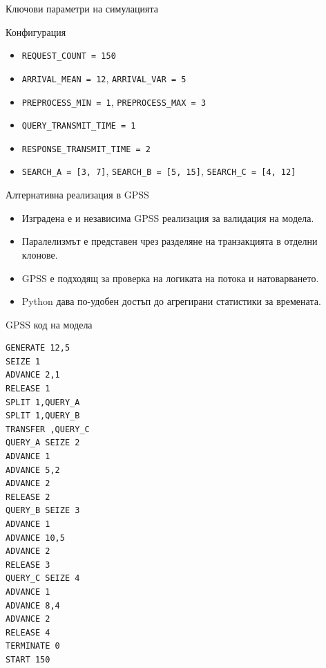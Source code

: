 \documentclass[aspectratio=169]{beamer}
\begin{document}
\begin{frame}{Ключови параметри на симулацията}
    \begin{block}{Конфигурация}
        \begin{itemize}
            \item \texttt{REQUEST\_COUNT = 150}
            \item \texttt{ARRIVAL\_MEAN = 12}, \texttt{ARRIVAL\_VAR = 5}
            \item \texttt{PREPROCESS\_MIN = 1}, \texttt{PREPROCESS\_MAX = 3}
            \item \texttt{QUERY\_TRANSMIT\_TIME = 1}
            \item \texttt{RESPONSE\_TRANSMIT\_TIME = 2}
            \item \texttt{SEARCH\_A = [3, 7]}, \texttt{SEARCH\_B = [5, 15]}, \texttt{SEARCH\_C = [4, 12]}
        \end{itemize}
    \end{block}
\end{frame}

\begin{frame}{Алтернативна реализация в GPSS}
    \begin{itemize}
        \item Изградена е и независима GPSS реализация за валидация на модела.
        \item Паралелизмът е представен чрез разделяне на транзакцията в отделни клонове.
        \item GPSS е подходящ за проверка на логиката на потока и натоварването.
        \item Python дава по-удобен достъп до агрегирани статистики за времената.
    \end{itemize}
\end{frame}

\begin{frame}[fragile]{GPSS код на модела}
\tiny
\begin{verbatim}
GENERATE 12,5
SEIZE 1
ADVANCE 2,1
RELEASE 1
SPLIT 1,QUERY_A
SPLIT 1,QUERY_B
TRANSFER ,QUERY_C
QUERY_A SEIZE 2
ADVANCE 1
ADVANCE 5,2
ADVANCE 2
RELEASE 2
QUERY_B SEIZE 3
ADVANCE 1
ADVANCE 10,5
ADVANCE 2
RELEASE 3
QUERY_C SEIZE 4
ADVANCE 1
ADVANCE 8,4
ADVANCE 2
RELEASE 4
TERMINATE 0
START 150
\end{verbatim}
\end{frame}
\end{document}
